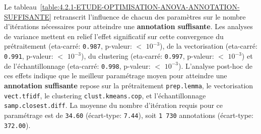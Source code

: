 			Le tableau~\ref{table:4.2.1-ETUDE-OPTIMISATION-ANOVA-ANNOTATION-SUFFISANTE} retranscrit l'influence de chacun des paramètres sur le nombre d'itérations nécessaires pour atteindre une \textbf{annotation suffisante}.
			Les analyses de variance mettent en relief l'effet significatif sur cette convergence du prétraitement (eta-carré: \texttt{0.987}, p-valeur: \(<\) \texttt{\(10^{-3}\)}), de la vectorisation (eta-carré: \texttt{0.991}, p-valeur: \(<\) \texttt{\(10^{-3}\)}), du clustering (eta-carré: \texttt{0.997}, p-valeur: \(<\) \texttt{\(10^{-3}\)}) et de l'échantillonnage (eta-carré: \texttt{0.998}, p-valeur: \(<\) \texttt{\(10^{-3}\)}).
			L'analyse post-hoc de ces effets indique que le meilleur paramétrage moyen pour atteindre une \textbf{annotation suffisante} repose sur la prétraitement \texttt{prep.lemma}, le vectorisation \texttt{vect.tfidf}, le clustering \texttt{clust.kmeans.cop}, et l'échantillonnage \texttt{samp.closest.diff}. La moyenne du nombre d'itération requis pour ce paramétrage est de \texttt{34.60} (écart-type: \texttt{7.44}), soit \texttt{1 730} annotations (écart-type: \texttt{372.00}).
